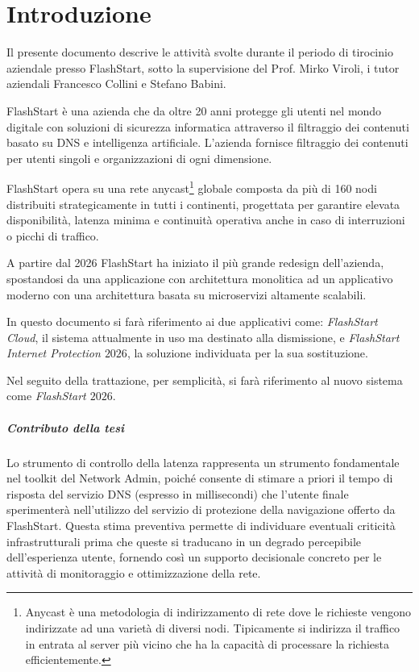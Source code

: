 \chapter{Introduzione}
\label{chap:introduction}

Il presente documento descrive le attività svolte durante il periodo di tirocinio aziendale presso FlashStart, sotto la supervisione del Prof. Mirko Viroli, i tutor aziendali Francesco Collini e Stefano Babini.

FlashStart è una azienda che da oltre 20 anni protegge gli utenti nel mondo digitale con soluzioni di sicurezza informatica attraverso il filtraggio dei contenuti basato su \ac{DNS} e intelligenza artificiale.
L'azienda fornisce filtraggio dei contenuti per utenti singoli e organizzazioni di ogni dimensione.

FlashStart opera su una rete anycast\footnote{Anycast è una metodologia di indirizzamento di rete dove le richieste vengono indirizzate ad una varietà di diversi nodi. Tipicamente si indirizza il traffico in entrata al server più vicino che ha la capacità di processare la richiesta efficientemente.} globale composta da più di 160 nodi distribuiti strategicamente in tutti i continenti, progettata per garantire elevata disponibilità, latenza minima e continuità operativa anche in caso di interruzioni o picchi di traffico.

A partire dal 2026 FlashStart ha iniziato il più grande redesign dell'azienda, spostandosi da una applicazione con architettura monolitica ad un applicativo moderno con una architettura basata su microservizi altamente scalabili.

In questo documento si farà riferimento ai due applicativi come: \textit{FlashStart Cloud}, il sistema attualmente in uso ma destinato alla dismissione, e \textit{FlashStart Internet Protection $2026$}, la soluzione individuata per la sua sostituzione.

Nel seguito della trattazione, per semplicità, si farà riferimento al nuovo sistema come \textit{FlashStart $2026$}.

\paragraph{Contributo della tesi}
Lo strumento di controllo della latenza rappresenta un strumento fondamentale nel toolkit del Network Admin, poiché consente di stimare a priori il tempo di risposta del servizio \ac{DNS} (espresso in millisecondi) che l'utente finale sperimenterà nell'utilizzo del servizio di protezione della navigazione offerto da FlashStart. Questa stima preventiva permette di individuare eventuali criticità infrastrutturali prima che queste si traducano in un degrado percepibile dell'esperienza utente, fornendo così un supporto decisionale concreto per le attività di monitoraggio e ottimizzazione della rete.

